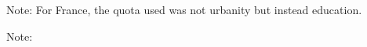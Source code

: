 \documentclass{article}
\begin{document}
\begin{table}[h!]
	\caption{Sample Characteristics -- All Countries}
	\begin{center}
		\scalebox{0.7}{}
	\end{center}
	{\footnotesize Note: For France, the quota used was not urbanity but instead education.
	\newline }
\end{table}	


\begin{table}[h!]
	\caption{Sample Characteristics -- France}
	\begin{center}
		\scalebox{0.7}{}
	\end{center}
	{\footnotesize Note: 
	\newline }
\end{table}	
\end{document}
